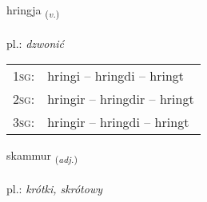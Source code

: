 \documentclass[frontgrid, backgrid]{flacards}\usepackage[]{graphicx}\usepackage[]{xcolor}
\begin{document}
\renewcommand{\flhead}{\vskip5pt \fboxsep=0pt {\small\bfseries\footnotesize Sagnorð | Verb}}
\renewcommand{\fcfoot}{\vskip5pt \fboxsep=0pt \hspace{2pt}{\small\bfseries\footnotesize 1K}}

\renewcommand{\blhead}{\vskip5pt {\small\bfseries\footnotesize Sagnorð | Verb }}
\renewcommand{\bcfoot}{\vskip5pt \hspace{2pt}{\small\bfseries\footnotesize 1K}}


{hringja \small{\textsubscript{(\textit{v.})}} \\[1ex] %
\textphonetic{[r̥iɲca]} \\
pl.: \emph{dzwonić} \\  [2ex]
\renewcommand*{\arraystretch}{0.8}
\begin{tabular}{p{1cm}l}
\textsc{1sg}: & hringi -- hringdi -- hringt \\ 
\textsc{2sg}: & hringir -- hringdir -- hringt \\ 
\textsc{3sg}: & hringir -- hringdi -- hringt \\ 
\end{tabular}
}

\renewcommand{\flhead}{\vskip5pt \fboxsep=0pt {\small\bfseries\footnotesize Lýsingarorð | Adjective}}
\renewcommand{\fcfoot}{\vskip5pt \fboxsep=0pt \hspace{2pt}{\small\bfseries\footnotesize 1K}}

\renewcommand{\blhead}{\vskip5pt {\small\bfseries\footnotesize Lýsingarorð | Adjective }}
\renewcommand{\bcfoot}{\vskip5pt \hspace{2pt}{\small\bfseries\footnotesize 1K}}


{skammur \small{\textsubscript{(\textit{adj.})}} \\[1ex] %
\textphonetic{[skamʏr]} \\
pl.: \emph{krótki, skrótowy} \\  [2ex]
\renewcommand*{\arraystretch}{0.8}
}
\end{document}
